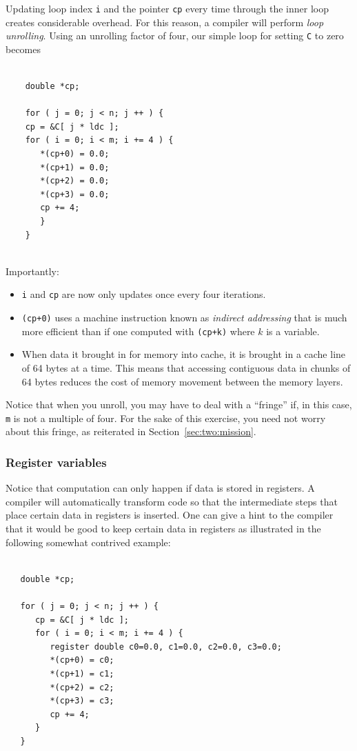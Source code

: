 Updating loop index {\tt i} and the pointer {\tt cp} every time through the inner loop creates considerable overhead.  For this reason, a compiler will perform {\em loop unrolling}.  Using an unrolling factor of four, our simple loop for setting {\tt C} to zero becomes
 \begin{verbatim}
 
    double *cp;
 
    for ( j = 0; j < n; j ++ ) {
    cp = &C[ j * ldc ];           
    for ( i = 0; i < m; i += 4 ) {                
       *(cp+0) = 0.0; 
       *(cp+1) = 0.0; 
       *(cp+2) = 0.0; 
       *(cp+3) = 0.0;
       cp += 4;                
       }                                           
    }  
              
 \end{verbatim}
Importantly:
\begin{itemize}
	\item {\tt i} and {\tt cp} are now only updates once every four iterations.
	\item {\tt *(cp+0)} uses a machine instruction known as {\em indirect addressing} that is much more efficient than if one computed with {\tt *(cp+k)} where $ k $ is a variable.  
	\item
	When data it brought in for memory into cache, it is brought in a cache line of 64 bytes at a time.  This means that accessing contiguous data in chunks of 64 bytes reduces the cost of memory movement between the memory layers.
\end{itemize}
Notice that when you unroll, you may have to deal with a ``fringe'' if, in this case, {\tt m} is not a multiple of four.    For the sake of this exercise, you need not worry about this fringe, as reiterated in Section~\ref{sec:two:mission}.

\subsubsection{Register variables}

Notice that computation can only happen if data is stored in registers.  A compiler will automatically transform code so that the intermediate steps that place certain data in registers is inserted.  One can give a hint to the compiler that it would be good to keep certain data in registers as illustrated in the following somewhat contrived example:
\begin{verbatim}

   double *cp;

   for ( j = 0; j < n; j ++ ) {
      cp = &C[ j * ldc ];           
      for ( i = 0; i < m; i += 4 ) {
         register double c0=0.0, c1=0.0, c2=0.0, c3=0.0;                
         *(cp+0) = c0; 
         *(cp+1) = c1; 
         *(cp+2) = c2; 
         *(cp+3) = c3;
         cp += 4;                
      }                                           
   }       
\end{verbatim}

